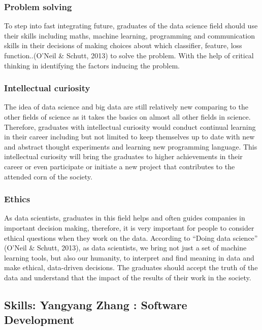 \documentclass[a4paper, 11pt]{report}
\begin{document}
\subsubsection{Problem solving}
To step into fast integrating future, graduates of the data science field should use their skills including maths, machine learning, programming and communication skills in their decisions of making choices about which classifier, feature, loss function..(O’Neil \& Schutt, 2013) to solve the problem. With the help of critical thinking in identifying the factors inducing the problem.

\subsubsection{Intellectual curiosity}
The idea of data science and big data are still relatively new comparing to the other fields of science as it takes the basics on almost all other fields in science. Therefore, graduates with intellectual curiosity would conduct continual learning in their career including but not limited to keep themselves up to date with new and abstract thought experiments and learning new programming language. This intellectual curiosity will bring the graduates to higher achievements in their career or even participate or initiate a new project that contributes to the attended corn of the society. 

\subsubsection{Ethics}
As data scientists, graduates in this field helps and often guides companies in important decision making, therefore, it is very important for people to consider ethical questions when they work on the data. According to “Doing data science” (O’Neil \& Schutt, 2013), as data scientists, we bring not just a set of machine learning tools, but also our humanity, to interpret and find meaning in data and make ethical, data-driven decisions. The graduates should accept the truth of the data and understand that the impact of the results of their work in the society. 


\subsection{Skills: Yangyang Zhang : Software Development}
\end{document}
